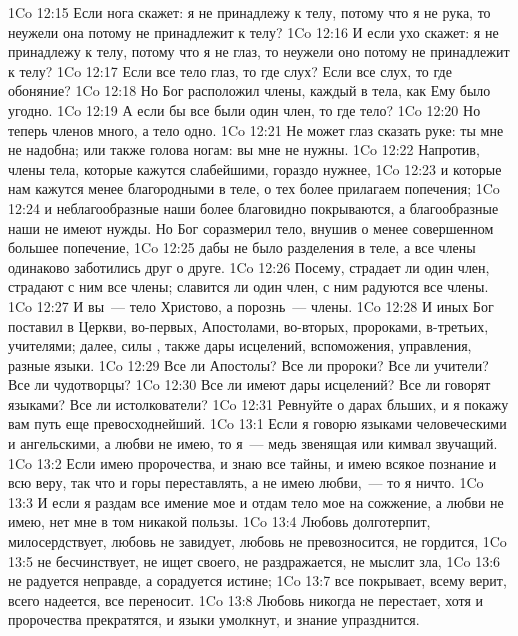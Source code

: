 \vs 1Co 12:15 Если нога скажет: я не принадлежу к телу, потому что я не рука, то неужели она потому не принадлежит к телу?
\vs 1Co 12:16 И если ухо скажет: я не принадлежу к телу, потому что я не глаз, то неужели оно потому не принадлежит к телу?
\vs 1Co 12:17 Если все тело глаз, то где слух? Если все слух, то где обоняние?
\vs 1Co 12:18 Но Бог расположил члены, каждый в  тела, как Ему было угодно.
\vs 1Co 12:19 А если бы все были один член, то где  тело?
\vs 1Co 12:20 Но теперь членов много, а тело одно.
\vs 1Co 12:21 Не может глаз сказать руке: ты мне не надобна; или также голова ногам: вы мне не нужны.
\vs 1Co 12:22 Напротив, члены тела, которые кажутся слабейшими, гораздо нужнее,
\vs 1Co 12:23 и которые нам кажутся менее благородными в теле, о тех более прилагаем попечения;
\vs 1Co 12:24 и неблагообразные наши более благовидно покрываются, а благообразные наши не имеют  нужды. Но Бог соразмерил тело, внушив о менее совершенном большее попечение,
\vs 1Co 12:25 дабы не было разделения в теле, а все члены одинаково заботились друг о друге.
\vs 1Co 12:26 Посему, страдает ли один член, страдают с ним все члены; славится ли один член, с ним радуются все члены.
\vs 1Co 12:27 И вы~--- тело Христово, а порознь~--- члены.
\vs 1Co 12:28 И иных Бог поставил в Церкви, во-первых, Апостолами, во-вторых, пророками, в-третьих, учителями; далее,  силы , также дары исцелений, вспоможения, управления, разные языки.
\vs 1Co 12:29 Все ли Апостолы? Все ли пророки? Все ли учители? Все ли чудотворцы?
\vs 1Co 12:30 Все ли имеют дары исцелений? Все ли говорят языками? Все ли истолкователи?
\vs 1Co 12:31 Ревнуйте о дарах бльших, и я покажу вам путь еще превосходнейший.
\vs 1Co 13:1 Если я говорю языками человеческими и ангельскими, а любви не имею, то я~--- медь звенящая или кимвал звучащий.
\vs 1Co 13:2 Если имею  пророчества, и знаю все тайны, и имею всякое познание и всю веру, так что  и горы переставлять, а не имею любви,~--- то я ничто.
\vs 1Co 13:3 И если я раздам все имение мое и отдам тело мое на сожжение, а любви не имею, нет мне в том никакой пользы.
\vs 1Co 13:4 Любовь долготерпит, милосердствует, любовь не завидует, любовь не превозносится, не гордится,
\vs 1Co 13:5 не бесчинствует, не ищет своего, не раздражается, не мыслит зла,
\vs 1Co 13:6 не радуется неправде, а сорадуется истине;
\vs 1Co 13:7 все покрывает, всему верит, всего надеется, все переносит.
\vs 1Co 13:8 Любовь никогда не перестает, хотя и пророчества прекратятся, и языки умолкнут, и знание упразднится.
